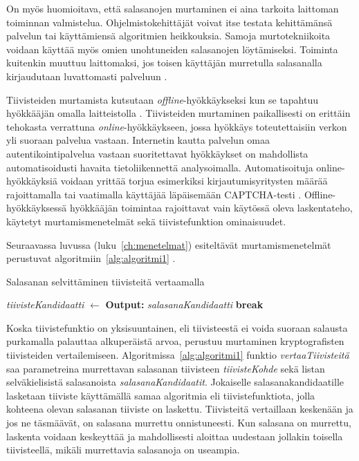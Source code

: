 On myös huomioitava, että salasanojen murtaminen ei aina tarkoita laittoman toiminnan valmistelua. Ohjelmistokehittäjät voivat itse testata kehittämänsä palvelun tai käyttämiensä algoritmien heikkouksia. Samoja murtotekniikoita voidaan käyttää myös omien unohtuneiden salasanojen löytämiseksi. Toiminta kuitenkin muuttuu laittomaksi, jos toisen käyttäjän murretulla salasanalla kirjaudutaan luvattomasti palveluun \citep{finlex_rikoslaki_2015}.

Tiivisteiden murtamista kutsutaan \textit{offline}-hyökkäykseksi kun se tapahtuu hyökkääjän omalla laitteistolla \citep{grassi_digital_2017}. Tiivisteiden murtaminen paikallisesti on erittäin tehokasta verrattuna \textit{online}-hyökkäykseen, jossa hyökkäys toteutettaisiin verkon yli suoraan palvelua vastaan. Internetin kautta palvelun omaa autentikointipalvelua vastaan suoritettavat hyökkäykset on mahdollista automatisoidusti havaita tietoliikennettä analysoimalla. Automatisoituja online-hyökkäyksiä voidaan yrittää torjua esimerkiksi kirjautumisyritysten määrää rajoittamalla tai vaatimalla käyttäjää läpäisemään CAPTCHA-testi \citep{owasp_authentication_2023}. Offline-hyökkäyksessä hyökkääjän toimintaa rajoittavat vain käytössä oleva laskentateho, käytetyt murtamismenetelmät sekä tiivistefunktion ominaisuudet.

Seuraavassa luvussa (luku~\ref{ch:menetelmat}) esiteltävät murtamismenetelmät perustuvat algoritmiin~\ref{alg:algoritmi1} \citep{owasp_storage_2023}.

\begin{algorithm}
    \caption{Salasanan selvittäminen tiivisteitä vertaamalla\label{alg:algoritmi1}}
    \begin{algorithmic}[1]
                \State \textit{tiivisteKandidaatti} $\gets$ 
                    \State \textbf{Output:} \textit{salasanaKandidaatti}
                    \State \textbf{break}
                \EndIf
            \EndFor
        \EndProcedure
    \end{algorithmic}
\end{algorithm}

Koska tiivistefunktio on yksisuuntainen, eli tiivisteestä ei voida suoraan salausta purkamalla palauttaa alkuperäistä arvoa, perustuu murtaminen kryptografisten tiivisteiden vertailemiseen. Algoritmissa~\ref{alg:algoritmi1} funktio \textit{vertaaTiivisteitä} saa parametreina murrettavan salasanan tiivisteen \textit{tiivisteKohde} sekä listan selväkielisistä salasanoista \textit{salasanaKandidaatit}. Jokaiselle salasanakandidaatille lasketaan tiiviste käyttämällä samaa algoritmia eli tiivistefunktiota, jolla kohteena olevan salasanan tiiviste on laskettu. Tiivisteitä vertaillaan keskenään ja jos ne täsmäävät, on salasana murrettu onnistuneesti. Kun salasana on murrettu, laskenta voidaan keskeyttää ja mahdollisesti aloittaa uudestaan jollakin toisella tiivisteellä, mikäli murrettavia salasanoja on useampia. 

